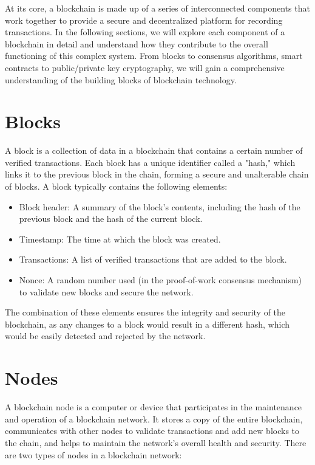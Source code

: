 \documentclass[target=mst,aauheader=]{thud}
\begin{document}
    At its core, a blockchain is made up of a series of interconnected components that work together to provide a secure and decentralized platform for recording transactions. In the following sections, we will explore each component of a blockchain in detail and understand how they contribute to the overall functioning of this complex system. From blocks to consensus algorithms, smart contracts to public/private key cryptography, we will gain a comprehensive understanding of the building blocks of blockchain technology.

    \section{Blocks}
    
    A block is a collection of data in a blockchain that contains a certain number of verified transactions. Each block has a unique identifier called a "hash," which links it to the previous block in the chain, forming a secure and unalterable chain of blocks. A block typically contains the following elements:
        
        \begin{itemize}

            \item Block header: A summary of the block's contents, including the hash of the previous block and the hash of the current block.
            \item Timestamp: The time at which the block was created.
            \item Transactions: A list of verified transactions that are added to the block.
            \item Nonce: A random number used (in the proof-of-work consensus mechanism) to validate new blocks and secure the network.
    
        \end{itemize}

    The combination of these elements ensures the integrity and security of the blockchain, as any changes to a block would result in a different hash, which would be easily detected and rejected by the network.

    \section{Nodes}
    
    A blockchain node is a computer or device that participates in the maintenance and operation of a blockchain network. It stores a copy of the entire blockchain, communicates with other nodes to validate transactions and add new blocks to the chain, and helps to maintain the network's overall health and security. There are two types of nodes in a blockchain network:
\end{document}
